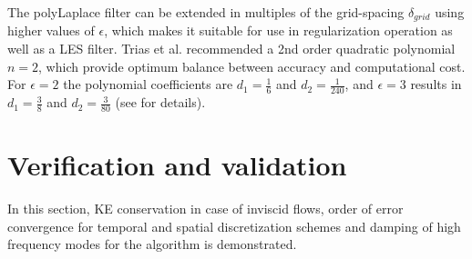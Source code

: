 The polyLaplace filter can be extended in multiples of the grid-spacing $\delta_{grid}$ using higher values of $\epsilon$, which makes it suitable for use in regularization operation as well as a LES filter. Trias et al. \cite{trias2011discretefilter} recommended a 2nd order quadratic polynomial $n=2$, which provide optimum balance between accuracy and computational cost. For $\epsilon = 2 $ the polynomial coefficients are $d_1 = \frac{1}{6}$ and $d_2 = \frac{1}{240}$, and $\epsilon = 3 $ results in $d_1 = \frac{3}{8}$ and $d_2 = \frac{3}{80}$ (see  \cite{trias2011discretefilter, trias2014} for details).


%

 

%
%




\clearpage
\newpage
\section{Verification and validation}
\label{sec:VnV}
In this section, KE conservation in case of inviscid flows, order of error convergence for temporal and spatial discretization schemes and damping of high frequency modes for the \spaece algorithm is demonstrated.

